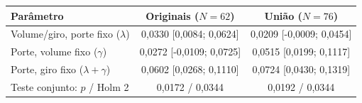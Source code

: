 \begin{tabular}{lcc}
\toprule
Parâmetro & Originais ($N=62$) & União ($N=76$)\\
\midrule
Volume/giro, porte fixo ($\lambda$) & 0,0330 [0,0084; 0,0624] & 0,0209 [-0,0009; 0,0454]\\
Porte, volume fixo ($\gamma$) & 0,0272 [-0,0109; 0,0725] & 0,0515 [0,0199; 0,1117]\\
Porte, giro fixo ($\lambda+\gamma$) & 0,0602 [0,0268; 0,1110] & 0,0724 [0,0430; 0,1319]\\
\midrule
Teste conjunto: $p$ / Holm 2 & 0,0172 / 0,0344 & 0,0192 / 0,0344\\
\bottomrule
\end{tabular}
